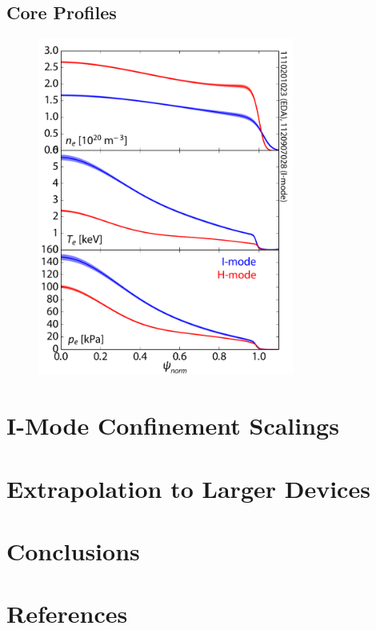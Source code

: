 \documentclass[12pt]{iopart}
\begin{document}
\subsection{Core Profiles}\label{subsec:core}

\begin{figure}[ht]
 \centering
 \includegraphics[width=0.75\textwidth]{coreprof_v3.pdf}
 \caption{}
 \label{fig:coreprof}
\end{figure}

\section{I-Mode Confinement Scalings}\label{sec:scalings}

\section{Extrapolation to Larger Devices}\label{sec:extrap}

\section{Conclusions}\label{sec:conclusion}

\section*{References}


\end{document}
